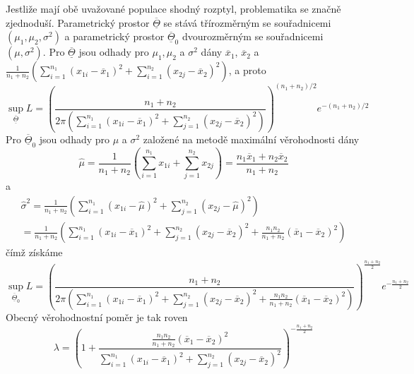 Jestliže mají obě uvažované populace shodný rozptyl, problematika se značně zjednoduší. Parametrický prostor $\overline{\underline{\Theta}}$ se stává třírozměrným se souřadnicemi $(\mu_1, \mu_2, \sigma^2)$ a parametrický prostor $\overline{\underline{\Theta}}_0$ dvourozměrným se souřadnicemi $(\mu, \sigma^2)$. Pro $\overline{\underline{\Theta}}$ jsou odhady pro $\mu_1, \mu_2$ a $\sigma^2$ dány $\overline{x}_1$, $\overline{x}_2$ a $\frac{1}{n_1 + n_2}\left(\sum_{i = 1}^{n_1}(x_{1i} - \overline{x}_1)^2 + \sum_{i = 1}^{n_2}(x_{2j} - \overline{x}_2)^2\right)$, a proto
\begin{equation*}
\sup_{\overline{\underline{\Theta}}}L = \left(\frac{n_1 + n_2}{2 \pi \left(\sum_{i = 1}^{n_1} (x_{1i} - \overline{x}_1)^2 + \sum_{j = 1}^{n_2}(x_{2j} - \overline{x}_2)^2\right)}\right)^{(n_1 + n_2)/2}e^{-(n_1 + n_2)/2}
\end{equation*}
Pro $\overline{\underline{\Theta}}_0$ jsou odhady pro $\mu$ a $\sigma^2$ založené na metodě maximální věrohodnosti dány
\begin{equation*}
\hat{\mu} = \frac{1}{n_1 + n_2}\left(\sum_{i = 1}^{n_1} x_{1i} + \sum_{j = 1}^{n_2} x_{2j} \right) = \frac{n_1 \overline{x}_1 + n_2 \overline{x}_2}{n_1 + n_2}
\end{equation*}
a
\begin{multline*}
\hat{\sigma}^2 = \frac{1}{n_1 + n_2}\left(\sum_{i = 1}^{n_1}(x_{1i} - \hat{\mu})^2 + \sum_{j = 1}^{n_2}(x_{2j} - \hat{\mu})^2 \right)\\
= \frac{1}{n_1 + n_2}\left(\sum_{i = 1}^{n_1} (x_{1i} - \overline{x}_1)^2 + \sum_{j = 1}^{n_2}(x_{2j} - \overline{x}_2)^2 + \frac{n_1 n_2}{n_1 + n_2}(\overline{x}_1 - \overline{x}_2)^2\right)
\end{multline*}
čímž získáme
\begin{equation*}
\sup_{\overline{\underline{\Theta}}_0} L = \left(\frac{n_1 + n_2}{2 \pi \left(\sum_{i = 1}^{n_1}(x_{1i} - \overline{x}_1)^2 + \sum_{j = 1}^{n_2}(x_{2j} - \overline{x}_2)^2 + \frac{n_1n_2}{n_1 + n_2}(\overline{x}_1 - \overline{x}_2)^2\right)}\right)^\frac{n_1 + n_2}{2} e^{-\frac{n_1 + n_2}{2}}
\end{equation*}
Obecný věrohodnostní poměr je tak roven
\begin{equation*}
\lambda = \left(1 + \frac{\frac{n_1n_2}{n_1 + n_2}(\overline{x}_1 - \overline{x}_2)^2}{\sum_{i = 1}^{n_1}(x_{1i} - \overline{x}_1)^2 + \sum_{j = 1}^{n_2}(x_{2j} - \overline{x}_2)^2} \right)^{-\frac{n_1 + n_2}{2}}
\end{equation*}
